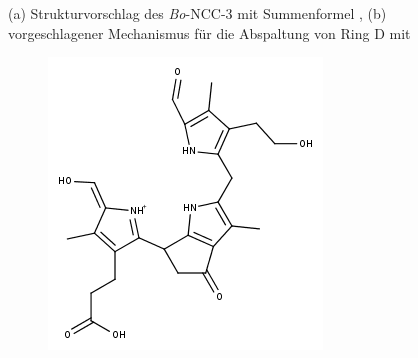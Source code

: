 \begin{figure}[!htbp]
\begin{subfigure}[b]{0.5\textwidth}
    \caption{}
    \label{fig:480Mechanismus}
  \end{subfigure}
  \caption[Strukturvorschlag des \textit{Bo}-NCC-3 und Vorschlag für Mechanismus der Abspaltung von Ring D, Quelle: Autor]{(a) Strukturvorschlag des \textit{Bo}-NCC-3 mit Summenformel , (b) vorgeschlagener Mechanismus für die Abspaltung von Ring D mit }
\end{figure}

\begin{figure}[!htbp]
  \begin{subfigure}[b]{0.5\textwidth}
    \includegraphics[width=\textwidth]{figures/Kapitel7/Kataboliten/fragmentation_structures/VWA_Katabolit_647-CO2-RingD_480_MH_Enolform.png}
    \caption{}
    \label{fig:480Enol}
  \end{subfigure}
  \hfill
  \begin{subfigure}[b]{0.5\textwidth}

\end{subfigure}
\end{figure}
